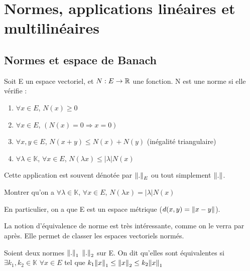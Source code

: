 \chapter{Normes, applications linéaires et multilinéaires}
\label{chapter:linear_application}



\section{Normes et espace de Banach}

\begin{definition}
    Soit E un espace vectoriel, et $N : E \rightarrow \mathbb{R}$ une fonction.
    N est une norme si elle vérifie :
    \begin{enumerate}
        \item $\forall x \in E$, $N(x) \geq 0$
        \item $\forall x \in E$, $(N(x) = 0 \Rightarrow x = 0)$
        \item $\forall x, y \in E$, $N(x + y) \leq N(x) + N(y)$ (inégalité
            triangulaire)
        \item $\forall \lambda \in \mathbb{K}$, $\forall x \in E$, $N(\lambda x)
            \leq |\lambda| N(x)$
    \end{enumerate}
    Cette application est souvent dénotée par $\norm{.}_{E}$ ou tout simplement
    $\norm{.}$.
\end{definition}

\begin{exercice}
    Montrer qu'on a
    $\forall \lambda \in \mathbb{K}$, $\forall x \in E$, $N(\lambda x) =
    |\lambda| N(x)$
\end{exercice}

En particulier, on a que E est un espace métrique ($d(x, y) = \norm{x - y}$).

La notion d'équivalence de norme est très intéressante, comme on le verra par
après. Elle permet de classer les espaces vectoriels normés.

\begin{definition}
    Soient deux normes $\norm{.}_{1}$ $\norm{.}_{2}$ sur E. On dit
	qu'elles sont équivalentes si $\exists k_{1}, k_{2} \in \mathbb{K}$ $\forall
	x \in E$ tel que $k_{1} \norm{x}_{1} \leq \norm{x}_{2} \leq
	k_{2} \norm{x}_{1}$
\end{definition}

